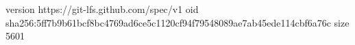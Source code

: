 version https://git-lfs.github.com/spec/v1
oid sha256:5ff7b9b61bcf8bc4769ad6ce5c1120cf94f79548089ae7ab45ede114cbf6a76c
size 5601
